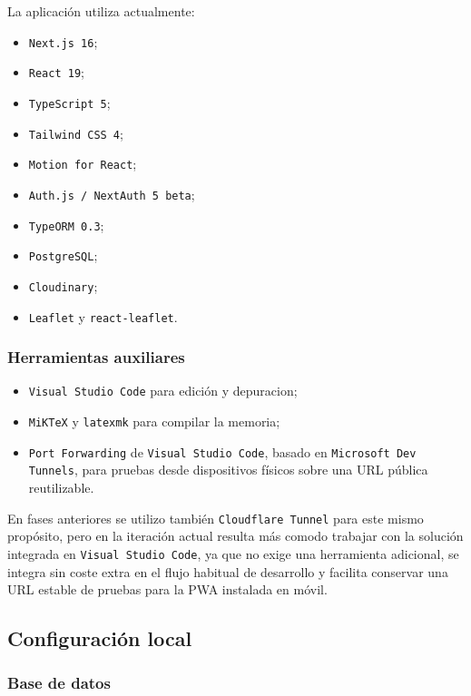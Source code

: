 La aplicación utiliza actualmente:

\begin{itemize}
    \item \texttt{Next.js 16};
    \item \texttt{React 19};
    \item \texttt{TypeScript 5};
    \item \texttt{Tailwind CSS 4};
    \item \texttt{Motion for React};
    \item \texttt{Auth.js / NextAuth 5 beta};
    \item \texttt{TypeORM 0.3};
    \item \texttt{PostgreSQL};
    \item \texttt{Cloudinary};
    \item \texttt{Leaflet} y \texttt{react-leaflet}.
\end{itemize}

\subsubsection*{Herramientas auxiliares}

\begin{itemize}
    \item \texttt{Visual Studio Code} para edición y depuracion;
    \item \texttt{MiKTeX} y \texttt{latexmk} para compilar la memoria;
    \item \texttt{Port Forwarding} de \texttt{Visual Studio Code}, basado en \texttt{Microsoft Dev Tunnels}, para pruebas desde dispositivos físicos sobre una URL pública reutilizable.
\end{itemize}

En fases anteriores se utilizo también \texttt{Cloudflare Tunnel} para este mismo propósito, pero en la iteración actual resulta más comodo trabajar con la solución integrada en \texttt{Visual Studio Code}, ya que no exige una herramienta adicional, se integra sin coste extra en el flujo habitual de desarrollo y facilita conservar una URL estable de pruebas para la PWA instalada en móvil.

\subsection{Configuración local}

\subsubsection*{Base de datos}

